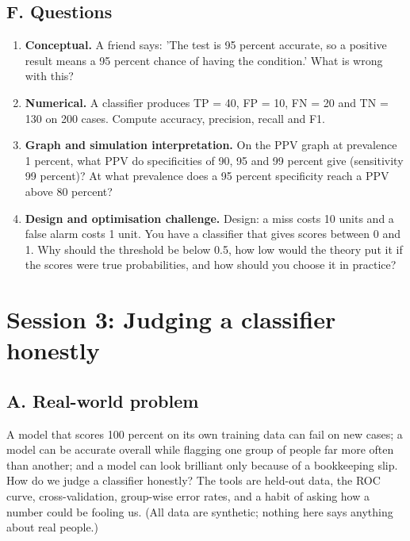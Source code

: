 \documentclass[11pt,a4paper]{article}
\begin{document}
\subsection*{F. Questions}
\begin{enumerate}[nosep]
\item \textbf{Conceptual.} A friend says: 'The test is 95 percent accurate, so a positive result means a 95 percent chance of having the condition.' What is wrong with this?
\item \textbf{Numerical.} A classifier produces TP = 40, FP = 10, FN = 20 and TN = 130 on 200 cases. Compute accuracy, precision, recall and F1.
\item \textbf{Graph and simulation interpretation.} On the PPV graph at prevalence 1 percent, what PPV do specificities of 90, 95 and 99 percent give (sensitivity 99 percent)? At what prevalence does a 95 percent specificity reach a PPV above 80 percent?
\item \textbf{Design and optimisation challenge.} Design: a miss costs 10 units and a false alarm costs 1 unit. You have a classifier that gives scores between 0 and 1. Why should the threshold be below 0.5, how low would the theory put it if the scores were true probabilities, and how should you choose it in practice?
\end{enumerate}

\section{Session 3: Judging a classifier honestly}

\subsection*{A. Real-world problem}
A model that scores 100 percent on its own training data can fail on new cases; a model can be accurate overall while flagging one group of people far more often than another; and a model can look brilliant only because of a bookkeeping slip. How do we judge a classifier honestly? The tools are held-out data, the ROC curve, cross-validation, group-wise error rates, and a habit of asking how a number could be fooling us. (All data are synthetic; nothing here says anything about real people.)
\end{document}
